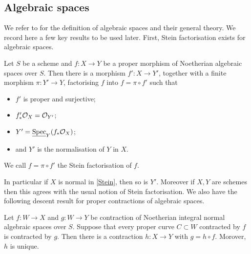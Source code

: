 	\subsection{Algebraic spaces}
	
	We refer to  for the definition of algebraic spaces and their general theory. We record here a few key results to be used later. First, Stein factorisation exists for algebraic spaces. 
	
	\begin{theorem}\label{Stein}
		Let $S$ be a scheme and $f \colon X \to Y$ be a proper morphism of Noetherian algebraic spaces over $S$. 
		Then there is a morphism $f' \colon X \to Y'$, together with a finite morphism $\pi \colon Y' \to Y$, factorising $f$ into $f=\pi \circ f'$  such that
		\begin{itemize}
			\item $f'$ is proper and surjective;
			\item $f'_{*}\ox = \ox[Y']$;
			\item $Y'=\underline{\textup{Spec}}_{Y}(f_{*}\ox)$;
			\item and $Y'$ is the normalisation of $Y$ in $X$.
		\end{itemize}
		We call $f=\pi\circ f'$ the Stein factorisation of $f$.
	\end{theorem}
	
	In particular if $X$ is normal in \autoref{Stein}, then so is $Y'$. Moreover if $X,Y$ are schemes then this agrees with the usual notion of Stein factorisation.
	We also have the following descent result for proper contractions of algebraic spaces.
	
	\begin{lemma}\label{as-ext}
		Let $f \colon W \to X$ and $g \colon W \to Y$ be contraction of Noetherian integral normal algebraic spaces over $S$. 
		Suppose that every proper curve $C \subset W$ contracted by $f$ is contracted by $g$. 
		Then there is a contraction $h\colon X \to Y$ with $g=h \circ f$. Morover, $h$ is unique.
	\end{lemma}
	
